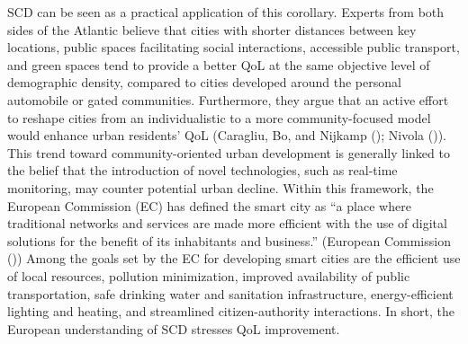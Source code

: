 \documentclass[
  english,
  12pt,
  a4paper,
]{scrartcl}
\begin{document}
SCD can be seen as a practical application of this corollary. Experts
from both sides of the Atlantic believe that cities with shorter
distances between key locations, public spaces facilitating social
interactions, accessible public transport, and green spaces tend to
provide a better QoL at the same objective level of demographic density,
compared to cities developed around the personal automobile or gated
communities. Furthermore, they argue that an active effort to reshape
cities from an individualistic to a more community-focused model would
enhance urban residents' QoL (Caragliu, Bo, and Nijkamp
(); Nivola
()). This trend toward
community-oriented urban development is generally linked to the belief
that the introduction of novel technologies, such as real-time
monitoring, may counter potential urban decline. Within this framework,
the European Commission (EC) has defined the smart city as ``a place
where traditional networks and services are made more efficient with the
use of digital solutions for the benefit of its inhabitants and
business.'' (European Commission
()) Among the
goals set by the EC for developing smart cities are the efficient use of
local resources, pollution minimization, improved availability of public
transportation, safe drinking water and sanitation infrastructure,
energy-efficient lighting and heating, and streamlined citizen-authority
interactions. In short, the European understanding of SCD stresses QoL
improvement.
\end{document}
